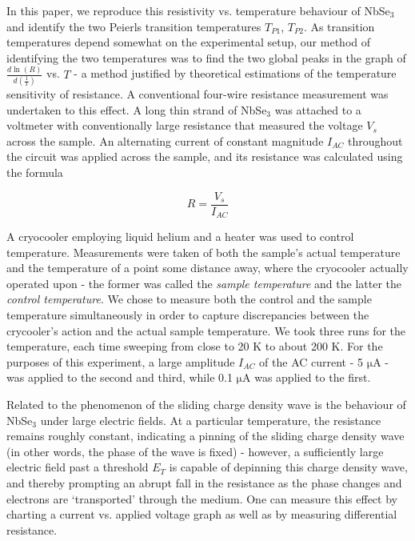 \documentclass[aps,prl,nofootinbib,twocolumn,superscriptaddress,groupedaddress]{revtex4}  %
\begin{document}
In this paper, we reproduce this resistivity vs. temperature behaviour of NbSe$_{3}$ and identify the two Peierls transition temperatures $T_{P1}$, $T_{P2}$. As transition temperatures depend somewhat on the experimental setup, our method of identifying the two temperatures was to find the two global peaks in the graph of $\frac{d \ln  (R)}{d \left(\frac{1}{T}\right)}$ vs. $T$ - a method justified by theoretical estimations of the temperature sensitivity of resistance. A conventional four-wire resistance measurement was undertaken to this effect. A long thin strand of NbSe$_{3}$ was attached to a voltmeter with conventionally large resistance that measured the voltage $V_{s}$ across the sample. An alternating current of constant magnitude $I_{AC}$ throughout the circuit was applied across the sample, and its resistance was calculated using the formula

\begin{equation}
R = \frac{V_{s}}{I_{AC}}
\end{equation}

A cryocooler employing liquid helium and a heater was used to control temperature. Measurements were taken of both the sample's actual temperature and the temperature of a point some distance away, where the cryocooler actually operated upon - the former was called the \textsl{sample temperature} and the latter the \textsl{control temperature}. We chose to measure both the control and the sample temperature simultaneously in order to capture discrepancies between the crycooler's action and the actual sample temperature. We took three runs for the temperature, each time sweeping from close to 20 K to about 200 K. For the purposes of this experiment, a large amplitude $I_{AC}$ of the AC current - 5 $\mathrm{\mu}$A - was applied to the second and third, while 0.1 $\mathrm{\mu}$A was applied to the first. 

Related to the phenomenon of the sliding charge density wave is the behaviour of NbSe$_{3}$ under large electric fields. At a particular temperature, the resistance remains roughly constant, indicating a pinning of the sliding charge density wave  (in other words, the phase of the wave is fixed) - however, a sufficiently large electric field past a threshold $E_{T}$ is capable of depinning this charge density wave, and thereby prompting an abrupt fall in the resistance as the phase changes and electrons are `transported' through the medium. One can measure this effect by charting a current vs. applied voltage graph as well as by measuring differential resistance.
\end{document}
